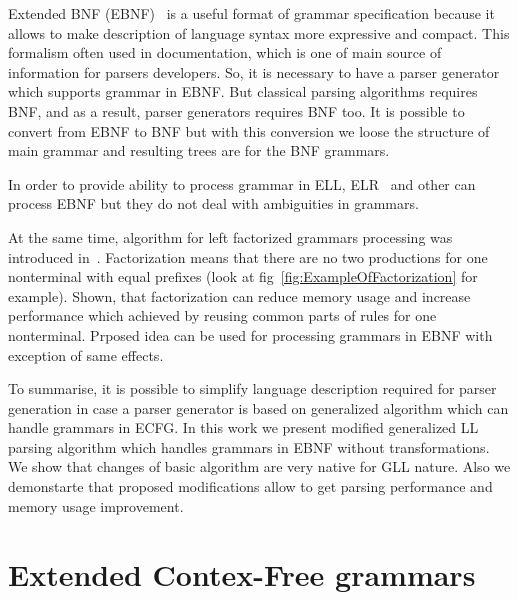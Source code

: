 \documentclass[runningheads,a4paper]{llncs}
\begin{document}
Extended BNF (EBNF)~\cite{EBNFISO} is a useful format of grammar specification because it allows to make description of language syntax more expressive and compact. 
This formalism often used in documentation, which is one of main source of information for parsers developers.
So, it is necessary to have a parser generator which supports grammar in EBNF.
But classical parsing algorithms requires BNF, and as a result, parser generators requires BNF too.
It is possible to convert from EBNF to BNF but with this conversion we loose the structure of main grammar and resulting trees are for the BNF grammars.

In order to provide ability to process grammar in ELL, ELR~\cite{AttributedELL,ELRR,ECFGparsing,ELLParser,ELL,ECFG,ELALR,ELRParsing} and other can process EBNF but they do not deal with ambiguities in grammars.

At the same time, algorithm for left factorized grammars processing was introduced in~\cite{scott2016structuring}.
Factorization means that there are no two productions for one nonterminal with equal prefixes (look at fig~\ref{fig:ExampleOfFactorization} for example).
Shown, that factorization can reduce memory usage and increase performance which achieved by reusing common parts of rules for one nonterminal.
Prposed idea can be used for processing grammars in EBNF with exception of same effects.

To summarise, it is possible to simplify language description required for parser generation in case a parser generator is based on generalized algorithm which can handle grammars in ECFG.
In this work we present modified generalized LL parsing algorithm which handles grammars in EBNF without transformations.
We show that changes of basic algorithm are very native for GLL nature. 
Also we demonstarte that proposed modifications allow to get parsing performance and memory usage improvement.





\section{Extended Contex-Free grammars}%
\end{document}

